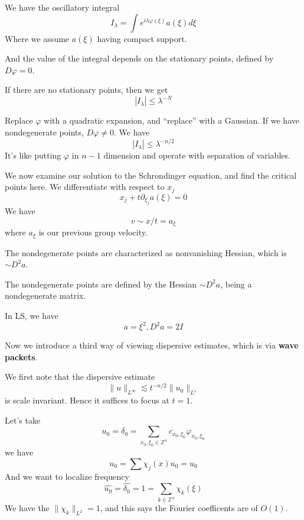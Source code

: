 We have the oscillatory integral
\begin{equation*}
    I_\lambda=\int e^{i\lambda \varphi(\xi)}a(\xi)d\xi
\end{equation*}
Where we assume $a(\xi)$ having compact support.


And the value of the integral depends on the stationary points, defined by $D\varphi=0$.

If there are no stationary points, then we get
\begin{equation*}
    |I_\lambda|\leq \lambda^{-N}
\end{equation*}

Replace $\varphi$ with a quadratic expansion, and ``replace'' with a Gaussian. If we have nondegenerate points, $D\varphi\neq 0$. We have
\begin{equation*}
    |I_\lambda|\leq\lambda^{-n/2}
\end{equation*}
It's like putting $\varphi$ in $n-1$ dimension and operate with separation of variables.

We now examine our solution to the Schrondinger equation, and find the critical points here. We differentiate with respect to $x_j$
\begin{equation*}
    x_j+t\partial_{\xi_j}a(\xi)=0
\end{equation*}
We have
\begin{equation*}
    v\sim x/t=a_\xi
\end{equation*}
where $a_\xi$ is our previous group velocity.

The nondegenerate points are characterized as nonvanishing Hessian, which is $\sim D^2a$.
\begin{definition}
    The nondegenerate points are defined by the Hessian $\sim D^2a$, being a nondegenerate matrix.
\end{definition}
In LS, we have
\begin{equation*}
    a=\xi^2, D^2a=2I
\end{equation*}

Now we introduce a third way of viewing dispersive estimates, which is via \textbf{wave packets}.

We first note that the dispersive estimate
\begin{equation*}
    \|u\|_{L^\infty}\lesssim t^{-n/2}\|u_0\|_{L^1}
\end{equation*}
is scale invariant.  Hence it suffices to focus at $t=1$.

Let's take
\begin{equation*}
    u_0=\delta_0=\sum_{x_0,\xi_0\in\mathbb{Z}^n}c_{x_0, \xi_0}\varphi_{x_0, \xi_0}
\end{equation*}
we have
\begin{equation*}
    u_0=\sum\chi_j(x)u_0=u_0
\end{equation*}
And we want to localize frequency
\begin{equation*}
    \widehat{u_0}=\widehat{\delta_0}=1=\sum_{k\in\mathbb{Z}^n}\chi_k(\xi)
\end{equation*}
We have the $\|\chi_k\|_{L^2}=1$, and this says the Fourier coefficents are of $O(1)$.

